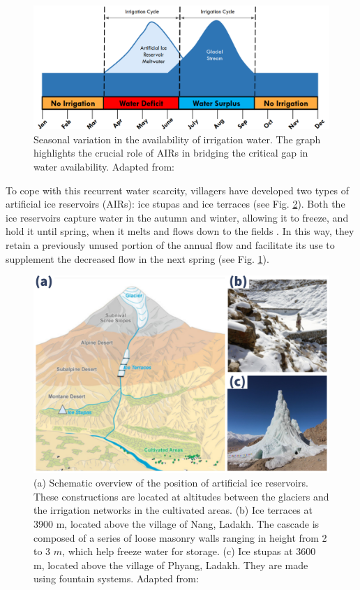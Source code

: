 \begin{figure}[htb]
\centering
\includegraphics[width=12cm]{figs/irrigation_cycles.png}
\caption{Seasonal variation in the availability of irrigation water. The graph highlights the crucial role of
AIRs in bridging the critical gap in water availability. Adapted from: \cite{nusserLocalKnowledgeGlobal2016}}
\label{fig:irrigation_cycles}
\end{figure}

To cope with this recurrent water scarcity, villagers have developed two types of artificial ice reservoirs
(AIRs): ice stupas and ice terraces (see Fig. \ref{fig:AIRforms}). Both the ice reservoirs capture water in the
autumn and winter, allowing it to freeze, and hold it until spring, when it melts and flows down to the fields
\citep{ipccChapterHighMountain2019, vinceGlacierMan2009, clouseLadakhArtificialGlaciers2017,
nusserSociohydrologyArtificialGlaciers2019}. In this way, they retain a previously unused portion of the annual
flow and facilitate its use to supplement the decreased flow in the next spring (see Fig.
\ref{fig:irrigation_cycles}).

\begin{figure}[t]
\centering
\includegraphics[width=12cm]{figs/AIR_forms.jpg}

\caption{(a) Schematic overview of the position of artificial ice reservoirs. These constructions are located at
  altitudes between the glaciers and the irrigation networks in the cultivated areas. (b) Ice terraces at 3900
  m, located above the village of Nang, Ladakh. The cascade is composed of a series of loose masonry walls
  ranging in height from 2 to 3 $m$, which help freeze water for storage. (c) Ice stupas at 3600 m, located
above the village of Phyang, Ladakh. They are made using fountain systems. Adapted from:
\cite{nusserLocalKnowledgeGlobal2016}}

\label{fig:AIRforms}
\end{figure}

